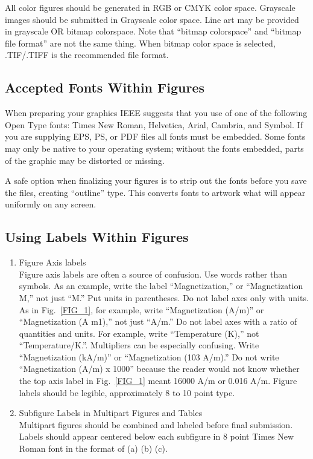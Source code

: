 \documentclass[journal]{IEEEtranTICPS}
\begin{document}
All color figures should be generated in RGB or CMYK color space. Grayscale images should be submitted in Grayscale color space. Line art may be provided in grayscale OR bitmap colorspace. Note that ``bitmap colorspace'' and ``bitmap file format'' are not the same thing. When bitmap color space is selected, .TIF/.TIFF is the recommended file format.


\subsection{Accepted Fonts Within Figures}

When preparing your graphics IEEE suggests that you use of one of the following Open Type fonts: Times New Roman, Helvetica, Arial, Cambria, and Symbol. If you are supplying EPS, PS, or PDF files all fonts must be embedded. Some fonts may only be native to your operating system; without the fonts embedded, parts of the graphic may be distorted or missing.

A safe option when finalizing your figures is to strip out the fonts before you save the files, creating ``outline'' type. This converts fonts to artwork what will appear uniformly on any screen.


\subsection{Using Labels Within Figures}

\begin{enumerate}
	\item Figure Axis labels\\
	Figure axis labels are often a source of confusion. Use words rather than symbols. As an example, write the label ``Magnetization,'' or ``Magnetization M,'' not just ``M.'' Put units in parentheses. Do not label axes only with units. As in \mbox{Fig. \ref{FIG_1}}, for example, write ``Magnetization (A/m)'' or ``Magnetization (A m1),'' not just ``A/m.'' Do not label axes with a ratio of quantities and units. For example, write ``Temperature (K),'' not ``Temperature/K.''. Multipliers can be especially confusing. Write ``Magnetization (kA/m)'' or ``Magnetization (103 A/m).'' Do not write ``Magnetization (A/m) x 1000'' because the reader would not know whether the top axis label in \mbox{Fig. \ref{FIG_1}} meant 16000 A/m or 0.016 A/m. Figure labels should be legible, approximately 8 to 10 point type.	
	\item Subfigure Labels in Multipart Figures and Tables\\
	Multipart figures should be combined and labeled before final submission. Labels should appear centered below each subfigure in 8 point Times New Roman font in the format of (a) (b) (c). 	
\end{enumerate}
\end{document}
